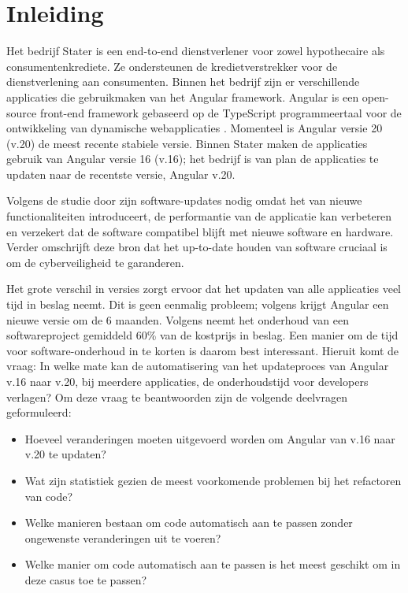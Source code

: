 
\section{Inleiding}
\label{sec:inleiding}

Het bedrijf Stater is een end-to-end dienstverlener voor zowel hypothecaire als consumentenkrediete.
Ze ondersteunen de kredietverstrekker voor de dienstverlening aan consumenten.
Binnen het bedrijf zijn er verschillende applicaties die gebruikmaken van het Angular framework.
Angular is een open-source front-end framework gebaseerd op de TypeScript programmeertaal voor de ontwikkeling van dynamische webapplicaties \autocite{Cincovic2019}.
Momenteel is Angular versie 20 (v.20) de meest recente stabiele versie.
Binnen Stater maken de applicaties gebruik van Angular versie 16 (v.16); het bedrijf is van plan de applicaties te updaten naar de recentste versie, Angular v.20.

Volgens de studie door \textcite{Vaniea2016} zijn software-updates nodig omdat het van nieuwe functionaliteiten introduceert, de performantie van de applicatie kan verbeteren en verzekert dat de software compatibel blijft met nieuwe software en hardware.
Verder omschrijft deze bron dat het up-to-date houden van software cruciaal is om de cyberveiligheid te garanderen.

Het grote verschil in versies zorgt ervoor dat het updaten van alle applicaties veel tijd in beslag neemt.
Dit is geen eenmalig probleem; volgens \textcite{Callaghan2023} krijgt Angular een nieuwe versie om de 6 maanden.
Volgens \textcite{Kaur2015} neemt het onderhoud van een softwareproject gemiddeld 60\% van de kostprijs in beslag.
Een manier om de tijd voor software-onderhoud in te korten is daarom best interessant.
Hieruit komt de vraag: In welke mate kan de automatisering van het updateproces van Angular v.16 naar v.20, bij meerdere applicaties, de onderhoudstijd voor developers verlagen?
Om deze vraag te beantwoorden zijn de volgende deelvragen geformuleerd:
\begin{itemize}
  \item Hoeveel veranderingen moeten uitgevoerd worden om Angular van v.16 naar v.20 te updaten? 
  \item Wat zijn statistiek gezien de meest voorkomende problemen bij het refactoren van code? 
  \item Welke manieren bestaan om code automatisch aan te passen zonder ongewenste veranderingen uit te voeren? 
  \item Welke manier om code automatisch aan te passen is het meest geschikt om in deze casus toe te passen?
\end{itemize}

